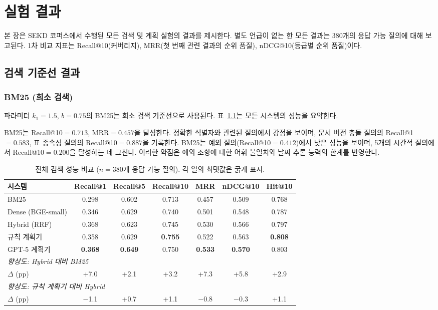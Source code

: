 \chapter{실험 결과}
\label{chap:results_ko}

본 장은 SEKD 코퍼스에서 수행된 모든 검색 및 계획 실험의 결과를 제시한다. 별도 언급이 없는 한 모든 결과는 380개의 응답 가능 질의에 대해 보고된다. 1차 비교 지표는 Recall@10(커버리지), MRR(첫 번째 관련 결과의 순위 품질), nDCG@10(등급별 순위 품질)이다.

\section{검색 기준선 결과}
\label{sec:results_baselines_ko}

\subsection{BM25 (희소 검색)}

파라미터 $k_1{=}1.5$, $b{=}0.75$의 BM25는 희소 검색 기준선으로 사용된다. 표~\ref{tab:retrieval_performance_ko}는 모든 시스템의 성능을 요약한다.

BM25는 Recall@10$={0.713}$, MRR$={0.457}$을 달성한다. 정확한 식별자와 관련된 질의에서 강점을 보이며, 문서 버전 충돌 질의의 Recall@1$={0.583}$, 표 종속성 질의의 Recall@10$={0.887}$을 기록한다. BM25는 예외 질의(Recall@10$={0.412}$)에서 낮은 성능을 보이며, 5개의 시간적 질의에서 Recall@10$={0.200}$을 달성하는 데 그친다. 이러한 약점은 예외 조항에 대한 어휘 불일치와 날짜 추론 능력의 한계를 반영한다.

\begin{table}[htbp]
\centering
\caption{전체 검색 성능 비교 ($n{=}380$개 응답 가능 질의). 각 열의 최댓값은 굵게 표시.}
\label{tab:retrieval_performance_ko}
\begin{tabular}{lcccccc}
\toprule
\textbf{시스템} & \textbf{Recall@1} & \textbf{Recall@5} & \textbf{Recall@10} & \textbf{MRR} & \textbf{nDCG@10} & \textbf{Hit@10} \\
\midrule
BM25                & 0.298 & 0.602 & 0.713 & 0.457 & 0.509 & 0.768 \\
Dense (BGE-small)   & 0.346 & 0.629 & 0.740 & 0.501 & 0.548 & 0.787 \\
Hybrid (RRF)        & 0.368 & 0.623 & 0.745 & 0.530 & 0.566 & 0.797 \\
규칙 계획기         & 0.358 & 0.629 & \textbf{0.755} & 0.522 & 0.563 & \textbf{0.808} \\
GPT-5 계획기        & \textbf{0.368} & \textbf{0.649} & 0.750 & \textbf{0.533} & \textbf{0.570} & 0.803 \\
\midrule
\multicolumn{7}{l}{\textit{향상도: Hybrid 대비 BM25}} \\
$\Delta$ (pp)       & +7.0  & +2.1  & +3.2  & +7.3  & +5.8  & +2.9  \\
\multicolumn{7}{l}{\textit{향상도: 규칙 계획기 대비 Hybrid}} \\
$\Delta$ (pp)       & $-$1.1 & +0.7  & +1.1  & $-$0.8 & $-$0.3 & +1.1  \\
\bottomrule
\end{tabular}
\end{table}

